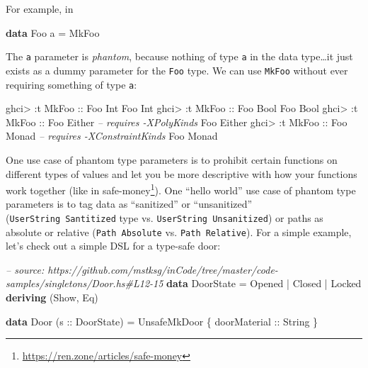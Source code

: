 \documentclass[]{article}
\newenvironment{Shaded}{\begin{snugshade}}{\end{snugshade}}
\newcommand{\CommentTok}[1]{\textcolor[rgb]{0.56,0.35,0.01}{\textit{#1}}}
\newcommand{\DataTypeTok}[1]{\textcolor[rgb]{0.13,0.29,0.53}{#1}}
\newcommand{\FunctionTok}[1]{\textcolor[rgb]{0.00,0.00,0.00}{#1}}
\newcommand{\KeywordTok}[1]{\textcolor[rgb]{0.13,0.29,0.53}{\textbf{#1}}}
\newcommand{\NormalTok}[1]{#1}
\newcommand{\OtherTok}[1]{\textcolor[rgb]{0.56,0.35,0.01}{#1}}
\renewcommand{\href}[2]{#2\footnote{\url{#1}}}
\begin{document}
For example, in

\begin{Shaded}
\begin{Highlighting}[]
\KeywordTok{data} \DataTypeTok{Foo}\NormalTok{ a }\FunctionTok{=} \DataTypeTok{MkFoo}
\end{Highlighting}
\end{Shaded}

The \texttt{a} parameter is \emph{phantom}, because nothing of type \texttt{a}
in the data type\ldots{}it just exists as a dummy parameter for the \texttt{Foo}
type. We can use \texttt{MkFoo} without ever requiring something of type
\texttt{a}:

\begin{Shaded}
\begin{Highlighting}[]
\NormalTok{ghci}\FunctionTok{>} \FunctionTok{:}\NormalTok{t }\DataTypeTok{MkFoo}\OtherTok{ ::} \DataTypeTok{Foo} \DataTypeTok{Int}
\DataTypeTok{Foo} \DataTypeTok{Int}
\NormalTok{ghci}\FunctionTok{>} \FunctionTok{:}\NormalTok{t }\DataTypeTok{MkFoo}\OtherTok{ ::} \DataTypeTok{Foo} \DataTypeTok{Bool}
\DataTypeTok{Foo} \DataTypeTok{Bool}
\NormalTok{ghci}\FunctionTok{>} \FunctionTok{:}\NormalTok{t }\DataTypeTok{MkFoo}\OtherTok{ ::} \DataTypeTok{Foo} \DataTypeTok{Either}        \CommentTok{-- requires -XPolyKinds}
\DataTypeTok{Foo} \DataTypeTok{Either}
\NormalTok{ghci}\FunctionTok{>} \FunctionTok{:}\NormalTok{t }\DataTypeTok{MkFoo}\OtherTok{ ::} \DataTypeTok{Foo} \DataTypeTok{Monad}         \CommentTok{-- requires -XConstraintKinds}
\DataTypeTok{Foo} \DataTypeTok{Monad}
\end{Highlighting}
\end{Shaded}

One use case of phantom type parameters is to prohibit certain functions on
different types of values and let you be more descriptive with how your
functions work together (like in
\href{https://ren.zone/articles/safe-money}{safe-money}). One ``hello world''
use case of phantom type parameters is to tag data as ``sanitized'' or
``unsanitized'' (\texttt{UserString\ \textquotesingle{}Santitized} type vs.
\texttt{UserString\ \textquotesingle{}Unsanitized}) or paths as absolute or
relative (\texttt{Path\ \textquotesingle{}Absolute} vs.
\texttt{Path\ \textquotesingle{}Relative}). For a simple example, let's check
out a simple DSL for a type-safe door:

\begin{Shaded}
\begin{Highlighting}[]
\CommentTok{-- source: https://github.com/mstksg/inCode/tree/master/code-samples/singletons/Door.hs#L12-15}
\KeywordTok{data} \DataTypeTok{DoorState} \FunctionTok{=} \DataTypeTok{Opened} \FunctionTok{|} \DataTypeTok{Closed} \FunctionTok{|} \DataTypeTok{Locked}
  \KeywordTok{deriving}\NormalTok{ (}\DataTypeTok{Show}\NormalTok{, }\DataTypeTok{Eq}\NormalTok{)}

\KeywordTok{data} \DataTypeTok{Door}\NormalTok{ (}\OtherTok{s ::} \DataTypeTok{DoorState}\NormalTok{) }\FunctionTok{=} \DataTypeTok{UnsafeMkDoor}\NormalTok{ \{}\OtherTok{ doorMaterial ::} \DataTypeTok{String}\NormalTok{ \}}
\end{Highlighting}
\end{Shaded}
\end{document}
